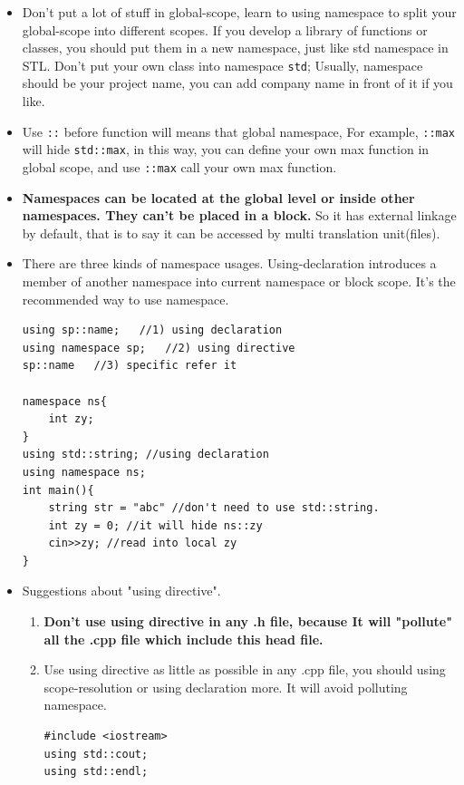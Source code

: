 \documentclass[a4paper,11pt,twoside]{book}
\begin{document}
\begin{itemize}
	\item Don't put a lot of stuff in global-scope, learn to using namespace to split your global-scope into different scopes. If you develop a library of functions or classes, you should put them in a new namespace, just like std namespace in STL. Don't put your own class into namespace \texttt{std}; Usually, namespace should be your project name, you can add company name in front of it if you like.
		
	\item Use \texttt{::} before function will means that global namespace, For example, \texttt{::max} will hide \texttt{std::max}, in this way, you can define your own max function in global scope, and use \texttt{::max} call your own max function. 
	
	\item \textbf{Namespaces can be located at the global level or inside other namespaces. They can't be placed in a block.} So it has external linkage by default, that is to say it can be accessed by multi translation unit(files).


	\item There are three kinds of namespace usages. Using-declaration introduces a member of another namespace into current namespace or block scope. It's the recommended way to use namespace. 
\begin{lstlisting}[numbers = none]
using sp::name;   //1) using declaration
using namespace sp;   //2) using directive
sp::name   //3) specific refer it
	
namespace ns{
	int zy;
}
using std::string; //using declaration
using namespace ns;
int main(){
	string str = "abc" //don't need to use std::string.
	int zy = 0; //it will hide ns::zy
	cin>>zy; //read into local zy
}
\end{lstlisting}

	\item Suggestions about "using directive".
\begin{enumerate}
	\item  \textbf{Don't use using directive in any .h file,  because It will "pollute" all the .cpp file which include this head file.}
	
	\item Use using directive as little as possible in any .cpp file, you should using scope-resolution or using declaration more. It will avoid polluting namespace.
\begin{lstlisting}[numbers=none]
#include <iostream>
using std::cout;
using std::endl;


\end{lstlisting}
\end{enumerate}
\end{itemize}
\end{document}
